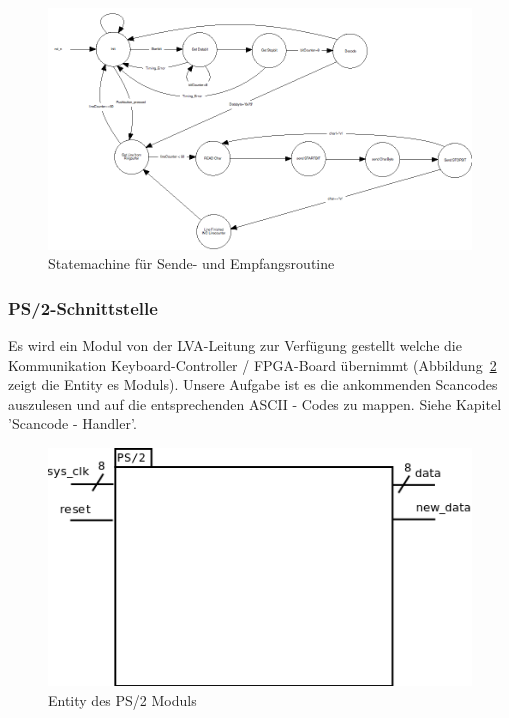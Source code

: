 \begin{figure}[!ht]
	\centering
	\includegraphics[scale=0.3]{figures/rs232SM.png} 
	\caption{Statemachine für Sende- und Empfangsroutine}
	\label{fig:rs232statemachine}
\end{figure}



\subsubsection{PS/2-Schnittstelle}

Es wird ein Modul von der LVA-Leitung zur Verfügung gestellt welche die Kommunikation Keyboard-Controller / FPGA-Board übernimmt (Abbildung~\ref{fig:entity_ps2} zeigt die Entity es Moduls). Unsere Aufgabe ist es die ankommenden Scancodes auszulesen und auf die entsprechenden ASCII - Codes zu mappen. Siehe Kapitel 'Scancode - Handler'.

\begin{figure}[!ht]
	\centering
	\includegraphics[scale=0.3]{figures/entity_ps2.png} 
	\caption{Entity des PS/2 Moduls}
	\label{fig:entity_ps2}
\end{figure}

